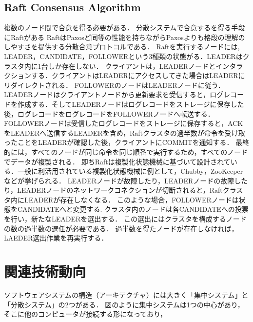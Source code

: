 \documentclass[a4paper,12pt]{jsarticle}
\begin{document}
\subsection{Raft Consensus Algorithm}\cite{Raft Consensus Algorithm}
\label{Raft}
複数のノード間で合意を得る必要がある．
分散システムで合意するを得る手段にRaftがある
RaftはPaxosど同等の性能を持ちながらPaxosよりも格段の理解のしやすさを提供する分散合意プロトコルである．
Raftを実行するノードには, LEADER，CANDIDATE，FOLLOWERという$3$種類の状態がる．LEADERはクラスタ内に1台しか存在しない．
クライアントは，LEADERノードとインタラクションする．クライアントはLEADERにアクセスしてきた場合はLEADERにリダイレクトされる．
FOLLOWERのノードはLEADERノードに従う．LEADERノードはクライアントノードから更新要求を受信すると，ログレコードを作成する．そしてLEADERノードはログレコードをストレージに保存した後，ログレコードをログレコードをFOLLOWERノードへ転送する．
FOLLOWERノードは受信したログレコードをストレージに保存すると，ACKをLEADERへ送信するLEADERを含め，Raftクラスタの過半数が命令を受け取ったことをLEADERが確認した後，クライアントにCOMMITを通知する．
最終的には，すべてのノードが同じ命令を同じ順番で実行するため，すべてのノードでデータが複製される．
即ちRaftは複製化状態機械に基づいて設計されている．一般に利活用されている複製化状態機械に例として，Chubby，ZooKeeperなどが挙げられる．
LEADERノードが故障したり，LEADERノードの故障したり，LEADERノードのネットワークコネクションが切断されると，Raftクラスタ内にLEADERが存在しなくなる．
このような場合，FOLLOWERノードは状態をCANDIDATEへと変更する.
クラスタ内のノードは各CANDIDATEへの投票を行い，新たなLEADERを選出する．
この選出にはクラスタを構成するノードの数の過半数の選任が必要である．
過半数を得たノードが存在しなければ，LAEDER選出作業を再実行する．

\newpage
\section{関連技術動向}
ソフトウェアシステムの構造（アーキテクチャ）には大きく「集中システム」と「分散システム」の2つがある．
図のように集中システムは1つの中心があり，そこに他のコンピュータが接続する形になっており，
\end{document}
